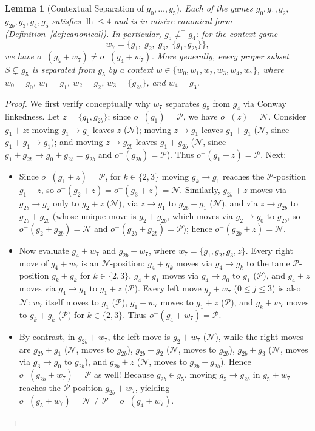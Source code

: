 \documentclass[11pt]{amsart}
\newtheorem{lemma}[theorem]{Lemma}
\theoremstyle{definition}
\theoremstyle{remark}
\newcommand{\Npos}{\mathcal{N}}
\newcommand{\Ppos}{\mathcal{P}}
\DeclareMathOperator{\lh}{lh}
\begin{document}
\begin{lemma}[Contextual Separation of $g_0, \dots, g_5$]
\label{lem:canon_g5}
Each of the games $g_0, g_1, g_2,$ $g_{2b}, g_3, g_4, g_5$ satisfies $\lh \le 4$ and is in mis\`ere canonical form (Definition~\ref{def:canonical}). In particular, $g_5 \not\equiv^- g_4$: for the context game
\[
  w_7 = \bigl\{g_1,\; g_2,\; g_3,\; \{g_1, g_{2b}\}\bigr\},
\]
we have $o^-(g_5 + w_7) \neq o^-(g_4 + w_7)$. More generally, every proper subset $S \subsetneq g_5$ is separated from $g_5$ by a context $w \in \{w_0, w_1, w_2, w_3, w_4, w_7\}$, where $w_0 = g_0$, $w_1 = g_1$, $w_2 = g_2$, $w_3 = \{g_{2b}\}$, and $w_4 = g_3$.
\end{lemma}

\begin{proof}
We first verify conceptually why $w_7$ separates $g_5$ from $g_4$ via Conway linkedness. Let $z = \{g_1, g_{2b}\}$; since $o^-(g_1) = \Ppos$, we have $o^-(z) = \Npos$. Consider $g_1 + z$: moving $g_1 \to g_0$ leaves $z$ ($\Npos$); moving $z \to g_1$ leaves $g_1 + g_1$ ($\Npos$, since $g_1 + g_1 \to g_1$); and moving $z \to g_{2b}$ leaves $g_1 + g_{2b}$ ($\Npos$, since $g_1 + g_{2b} \to g_0 + g_{2b} = g_{2b}$ and $o^-(g_{2b}) = \Ppos$). Thus $o^-(g_1 + z) = \Ppos$. Next:
\begin{itemize}
  \item Since $o^-(g_1 + z) = \Ppos$, for $k \in \{2, 3\}$ moving $g_k \to g_1$ reaches the $\Ppos$-position $g_1 + z$, so $o^-(g_2 + z) = o^-(g_3 + z) = \Npos$. Similarly, $g_{2b} + z$ moves via $g_{2b} \to g_2$ only to $g_2 + z$ ($\Npos$), via $z \to g_1$ to $g_{2b} + g_1$ ($\Npos$), and via $z \to g_{2b}$ to $g_{2b} + g_{2b}$ (whose unique move is $g_2 + g_{2b}$, which moves via $g_2 \to g_0$ to $g_{2b}$, so $o^-(g_2 + g_{2b}) = \Npos$ and $o^-(g_{2b} + g_{2b}) = \Ppos$); hence $o^-(g_{2b} + z) = \Npos$.
  \item Now evaluate $g_4 + w_7$ and $g_{2b} + w_7$, where $w_7 = \{g_1, g_2, g_3, z\}$. Every right move of $g_4 + w_7$ is an $\Npos$-position: $g_4 + g_k$ moves via $g_4 \to g_k$ to the tame $\Ppos$-position $g_k + g_k$ for $k \in \{2,3\}$, $g_4 + g_1$ moves via $g_4 \to g_0$ to $g_1$ ($\Ppos$), and $g_4 + z$ moves via $g_4 \to g_1$ to $g_1 + z$ ($\Ppos$). Every left move $g_j + w_7$ ($0 \le j \le 3$) is also $\Npos$: $w_7$ itself moves to $g_1$ ($\Ppos$), $g_1 + w_7$ moves to $g_1 + z$ ($\Ppos$), and $g_k + w_7$ moves to $g_k + g_k$ ($\Ppos$) for $k \in \{2, 3\}$. Thus $o^-(g_4 + w_7) = \Ppos$.
  \item By contrast, in $g_{2b} + w_7$, the left move is $g_2 + w_7$ ($\Npos$), while the right moves are $g_{2b} + g_1$ ($\Npos$, moves to $g_{2b}$), $g_{2b} + g_2$ ($\Npos$, moves to $g_{2b}$), $g_{2b} + g_3$ ($\Npos$, moves via $g_3 \to g_0$ to $g_{2b}$), and $g_{2b} + z$ ($\Npos$, moves to $g_{2b} + g_{2b}$). Hence $o^-(g_{2b} + w_7) = \Ppos$ as well! Because $g_{2b} \in g_5$, moving $g_5 \to g_{2b}$ in $g_5 + w_7$ reaches the $\Ppos$-position $g_{2b} + w_7$, yielding $o^-(g_5 + w_7) = \Npos \neq \Ppos = o^-(g_4 + w_7)$.

\end{itemize}
\end{proof}
\end{document}
